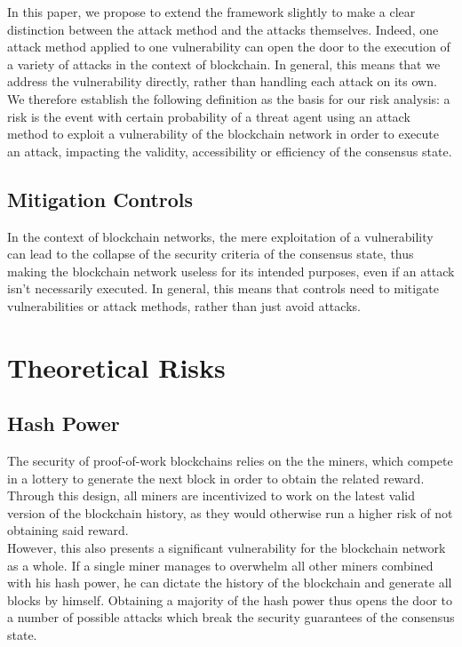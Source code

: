 \documentclass[11pt,a4paper,draft]{article}
\begin{document}
In this paper, we propose to extend the framework slightly to make a clear distinction between the attack method and the attacks themselves. Indeed, one attack method applied to one vulnerability can open the door to the execution of a variety of attacks in the context of blockchain. In general, this means that we address the vulnerability directly, rather than handling each attack on its own.\\

We therefore establish the following definition as the basis for our risk analysis: a risk is the event with certain probability of a threat agent using an attack method to exploit a vulnerability of the blockchain network in order to execute an attack, impacting the validity, accessibility or efficiency of the consensus state.\\

\subsection{Mitigation Controls}

In the context of blockchain networks, the mere exploitation of a vulnerability can lead to the collapse of the security criteria of the consensus state, thus making the blockchain network useless for its intended purposes, even if an attack isn't necessarily executed. In general, this means that controls need to mitigate vulnerabilities or attack methods, rather than just avoid attacks.\\

\section{Theoretical Risks}

\subsection{Hash Power}

The security of proof-of-work blockchains relies on the the miners, which compete in a lottery to generate the next block in order to obtain the related reward. Through this design, all miners are incentivized to work on the latest valid version of the blockchain history, as they would otherwise run a higher risk of not obtaining said reward.\\

However, this also presents a significant vulnerability for the blockchain network as a whole. If a single miner manages to overwhelm all other miners combined with his hash power, he can dictate the history of the blockchain and generate all blocks by himself. Obtaining a majority of the hash power thus opens the door to a number of possible attacks which break the security guarantees of the consensus state.\\
\end{document}
